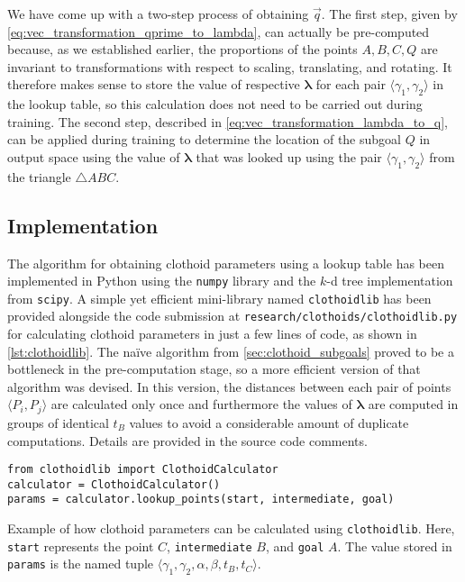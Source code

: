We have come up with a two-step process of obtaining $\vec{q}$.
The first step, given by \ref{eq:vec_transformation_qprime_to_lambda}, can actually be pre-computed because, as we established earlier, the proportions of the points $A,B,C,Q$ are invariant to transformations with respect to scaling, translating, and rotating.
It therefore makes sense to store the value of respective $\boldsymbol{\lambda}$ for each pair $\langle \gamma_1,\gamma_2 \rangle$ in the lookup table, so this calculation does not need to be carried out during training.
The second step, described in \ref{eq:vec_transformation_lambda_to_q}, can be applied during training to determine the location of the subgoal $Q$ in output space using the value of $\boldsymbol{\lambda}$ that was looked up using the pair $\langle \gamma_1,\gamma_2 \rangle$ from the triangle $\triangle{ABC}$.

\subsection{Implementation}
The algorithm for obtaining clothoid parameters using a lookup table has been implemented in Python using the \texttt{numpy} library and the $k$-d tree implementation from \texttt{scipy}.
A simple yet efficient mini-library named \texttt{clothoidlib} has been provided alongside the code submission at \texttt{research/clothoids/clothoidlib.py} for calculating clothoid parameters in just a few lines of code, as shown in \ref{lst:clothoidlib}. 
The na\"{i}ve algorithm from \ref{sec:clothoid_subgoals} proved to be a bottleneck in the pre-computation stage, so a more efficient version of that algorithm was devised.
In this version, the distances between each pair of points $\langle P_i, P_j \rangle$ are calculated only once and furthermore the values of $\boldsymbol{\lambda}$ are computed in groups of identical $t_B$ values to avoid a considerable amount of duplicate computations.
Details are provided in the source code comments.
\begin{listing}[h]
\begin{verbatim}
from clothoidlib import ClothoidCalculator
calculator = ClothoidCalculator()
params = calculator.lookup_points(start, intermediate, goal)
\end{verbatim}
\caption{Example of how clothoid parameters can be calculated using \texttt{clothoidlib}. Here, \texttt{start} represents the point $C$, \texttt{intermediate} $B$, and \texttt{goal} $A$. The value stored in \texttt{params} is the named tuple $\langle \gamma_1, \gamma_2, \alpha, \beta, t_B, t_C \rangle$.}
\label{lst:clothoidlib}
\end{listing}

